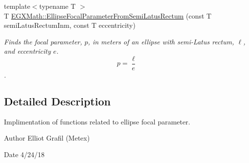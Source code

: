 \begin{DoxyCompactItemize}
{\footnotesize template$<$typename T $>$ }\\T \mbox{\hyperlink{group___e_g_x_math-_geometry-2_d-_ellipse-_focal_parameter_gaf957cf9131d3998bfe944f6234a133e6}{E\+G\+X\+Math\+::\+Ellipse\+Focal\+Parameter\+From\+Semi\+Latus\+Rectum}} (const T semi\+Latus\+Rectum\+Inm, const T eccentricity)
\begin{DoxyCompactList}\small\item\em Finds the focal parameter, $p$, in meters of an ellipse with semi-\/\+Latus rectum, $\ell$, and eccentricity $e$. \[ p=\frac{\ell}{e} \]. \end{DoxyCompactList}\end{DoxyCompactItemize}


\subsection{Detailed Description}
Implimentation of functions related to ellipse focal parameter. 

\begin{DoxyAuthor}{Author}
Elliot Grafil (Metex) 
\end{DoxyAuthor}
\begin{DoxyDate}{Date}
4/24/18 
\end{DoxyDate}
